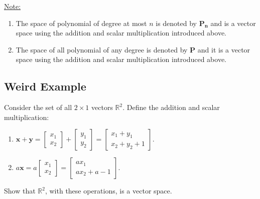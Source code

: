 \documentclass[20pt,a4paper]{extarticle}
\newcounter{example}
\begin{document}
\phantom{2}

\newpage 

\phantom{2} 

\vfill 

\underline{Note:} 
	\begin{enumerate}[label=\Circled{\arabic*}]
		\item The space of polynomial of degree at most $n$ is denoted by $\mathbf{P_n}$ and is a vector space using the addition and scalar multiplication introduced above.
		\item The space of all polynomial of any degree is denoted by $\mathbf{P}$ and it is a vector space using the addition and scalar multiplication introduced above.
	\end{enumerate}

\newpage 

\subsection{Weird Example}

\begin{example}
Consider the set of all $2 \times 1$ vectors $\mathbb{R}^2$. Define the addition and scalar multiplication:
	\begin{enumerate}
		\item $\mathbf{x} + \mathbf{y} = \begin{bmatrix} x_1 \\ x_2 \end{bmatrix} + \begin{bmatrix} y_1 \\ y_2 \end{bmatrix} = \begin{bmatrix} x_1 + y_1 \\ x_2 + y_2 + 1 \end{bmatrix}$.
		\item $a \mathbf{x} = a \begin{bmatrix} x_1 \\ x_2 \end{bmatrix} = \begin{bmatrix} a x_1 \\ a x_2 + a - 1 \end{bmatrix}$. 
	\end{enumerate}
Show that $\mathbb{R}^2$, with these operations, is a vector space.
\end{example}

\begin{solution}

\end{solution}
\end{document}
